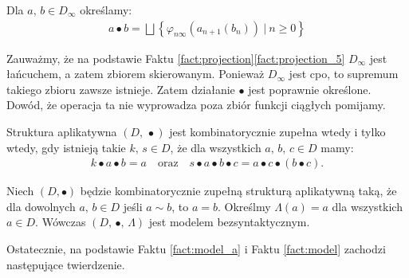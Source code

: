 \begin{definicja}%
  Dla \(a,\,b\in D_\infty\) określamy:
\begin{align*}
a \bullet b = \bigsqcup\left\{\varphi_{n\infty}(a_{n+1}(b_n))\ |\ n\geq 0\right\}%
\end{align*}
\end{definicja}

Zauważmy, że na podstawie Faktu \ref{fact:projection}\ref{fact:projection_5} \(D_\infty\) jest łańcuchem, a zatem zbiorem skierowanym. Ponieważ \(D_\infty\) jest cpo, to supremum takiego zbioru zawsze istnieje. Zatem działanie \(\bullet\) jest poprawnie określone.
Dowód, że operacja ta nie wyprowadza poza zbiór funkcji ciągłych pomijamy. 

\begin{fakt}\label{fact:model_a}%
Struktura aplikatywna \((D,\,\bullet)\) jest kombinatorycznie zupełna wtedy i tylko wtedy, gdy istnieją takie \(k,\,s\in D\), że dla wszystkich \(a,\,b,\,c\in D\) mamy: 
\begin{align*}
k\bullet a\bullet b = a\quad \text{oraz}\quad s\bullet a \bullet b \bullet c = a\bullet c \bullet (b \bullet c).
\end{align*}
\end{fakt}

\begin{fakt}\label{fact:model}%
  Niech \((D,\bullet)\) będzie kombinatorycznie zupełną strukturą aplikatywną taką, że
  dla dowolnych \(a,\,b\in D\) jeśli \(a\sim b\), to \(a=b\).
  Określmy \(\Lambda(a)=a\) dla wszystkich \(a\in D\). Wówczas \((D,\,\bullet,\,\Lambda)\) jest modelem bezsyntaktycznym. 
\end{fakt}

Ostatecznie, na podstawie Faktu \ref{fact:model_a} i Faktu \ref{fact:model} zachodzi następujące twierdzenie.

